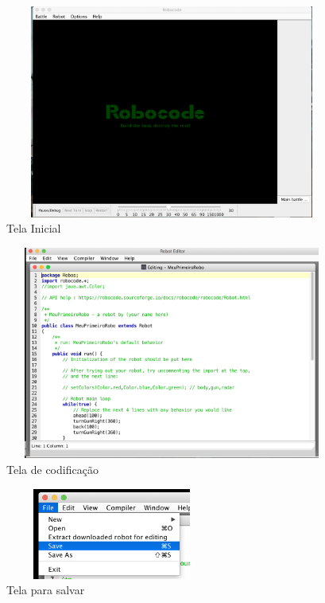 \begin{frame}
	\begin{block}{}
		\begin{figure}[!htb]
			\centering	  				
			\includegraphics[height=7cm, width = 11cm]{./pic/telaInicial.png}
			\caption{Tela Inicial}
			\label{fig_instalacao04}
		\end{figure}
	\end{block}
\end{frame}


\begin{frame}
	\begin{block}{}
		\begin{figure}[!htb]
			\centering	  				
			\includegraphics[height=7cm, width = 11cm]{./pic/codigo.png}
			\caption{Tela de codificação}
			\label{fig_instalacao04}
		\end{figure}
	\end{block}
\end{frame}

\begin{frame}
	\begin{block}{}
		\begin{figure}[!htb]
			\centering	  				
			\includegraphics[height=3cm, width = 7cm]{./pic/salvar.png}
			\caption{Tela para salvar}
			\label{fig_instalacao04}
		\end{figure}
	\end{block}
\end{frame}


